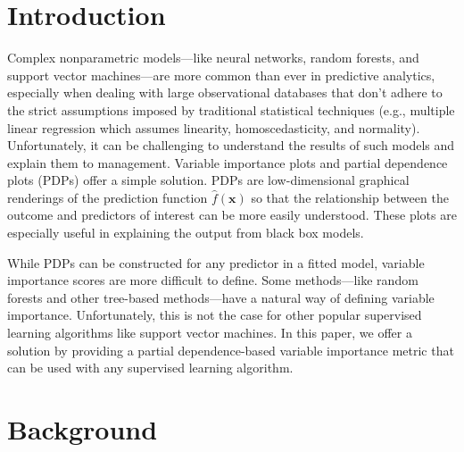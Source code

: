 \documentclass[12pt]{article}
\begin{document}
\newpage
{} %


\section{Introduction}
\label{sec:introduction}

Complex nonparametric models---like neural networks, random forests, and support vector machines---are more common than ever in predictive analytics, especially when dealing with large observational databases that don't adhere to the strict assumptions imposed by traditional statistical techniques (e.g., multiple linear regression which assumes linearity, homoscedasticity, and normality). Unfortunately, it can be challenging to understand the results of such models and explain them to management. Variable importance plots and partial dependence plots (PDPs) offer a simple solution. PDPs are low-dimensional graphical renderings of the prediction function $\widehat{f}\left(\boldsymbol{x}\right)$ so that the relationship between the outcome and predictors of interest can be more easily understood. These plots are especially useful in explaining the output from black box models.

While PDPs can be constructed for any predictor in a fitted model, variable importance scores are more difficult to define. Some methods---like random forests and other tree-based methods---have a natural way of defining variable importance. Unfortunately, this is not the case for other popular supervised learning algorithms like support vector machines. In this paper, we offer a solution by providing a partial dependence-based variable importance metric that can be used with any supervised learning algorithm.


\section{Background}
\label{sec:background}
\end{document}
